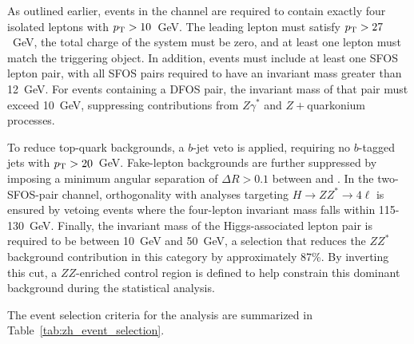 As outlined earlier, events in the \zh{} channel are required to contain exactly four isolated leptons with $p_{\mathrm{T}} > 10$~GeV. The leading lepton must satisfy $p_{\mathrm{T}} > 27$~GeV, the total charge of the system must be zero, and at least one lepton must match the triggering object. In addition, events must include at least one SFOS lepton pair, with all SFOS pairs required to have an invariant mass greater than 12~GeV. For events containing a DFOS pair, the invariant mass of that pair must exceed 10~GeV, suppressing contributions from $Z\gamma^{*}$ and $Z+$quarkonium processes.

To reduce top-quark backgrounds, a $b$-jet veto is applied, requiring no $b$-tagged jets with $p_{\mathrm{T}} > 20$~GeV. Fake-lepton backgrounds are further suppressed by imposing a minimum angular separation of $\Delta R > 0.1$ between \lzero{} and \lone{}. In the two-SFOS-pair channel, orthogonality with analyses targeting $H \to ZZ^{*} \to 4\ell$ is ensured by vetoing events where the four-lepton invariant mass falls within 115-130~GeV. Finally, the invariant mass of the Higgs-associated lepton pair is required to be between 10~GeV and 50~GeV, a selection that reduces the $ZZ^{*}$ background contribution in this category by approximately 87\%. By inverting this cut, a $ZZ$-enriched control region is defined to help constrain this dominant background during the statistical analysis. 

The event selection criteria for the \zh{} analysis are summarized in Table~\ref{tab:zh_event_selection}.

